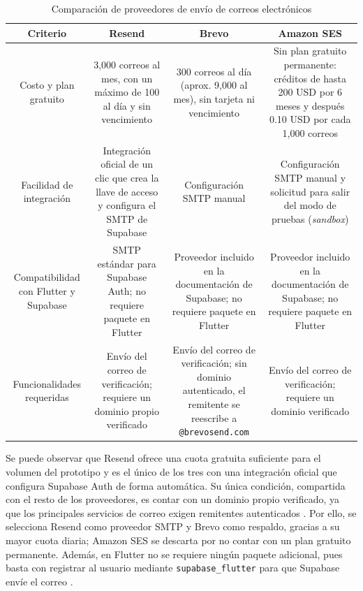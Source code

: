 \begin{table}[htbp]
\centering
\footnotesize
\caption{Comparación de proveedores de envío de correos electrónicos}
\label{tab:comparativa-correo}
\begin{tabularx}{\textwidth}{ |C|C|C|C| }
\hline
\textbf{Criterio} & \textbf{Resend} & \textbf{Brevo} & \textbf{Amazon SES} \\ \hline

Costo y plan gratuito &
3,000 correos al mes, con un máximo de 100 al día y sin vencimiento \cite{resend_pricing} &
300 correos al día (aprox. 9,000 al mes), sin tarjeta ni vencimiento \cite{brevo_api} &
Sin plan gratuito permanente: créditos de hasta 200 USD por 6 meses y después 0.10 USD por cada 1,000 correos \cite{amazon_ses_pricing} \\ \hline

Facilidad de integración &
Integración oficial de un clic que crea la llave de acceso y configura el SMTP de Supabase \cite{resend_supabase} &
Configuración SMTP manual \cite{supabase_smtp} &
Configuración SMTP manual y solicitud para salir del modo de pruebas (\textit{sandbox}) \cite{amazon_ses_pricing} \\ \hline

Compatibilidad con Flutter y Supabase &
SMTP estándar para Supabase Auth; no requiere paquete en Flutter \cite{resend_supabase} &
Proveedor incluido en la documentación de Supabase; no requiere paquete en Flutter \cite{supabase_smtp} &
Proveedor incluido en la documentación de Supabase; no requiere paquete en Flutter \cite{supabase_smtp} \\ \hline

Funcionalidades requeridas &
Envío del correo de verificación; requiere un dominio propio verificado \cite{resend_supabase} &
Envío del correo de verificación; sin dominio autenticado, el remitente se reescribe a \texttt{@brevosend.com} \cite{brevo_dominio} &
Envío del correo de verificación; requiere un dominio verificado \cite{amazon_ses_pricing} \\ \hline
\end{tabularx}
\end{table}

Se puede observar que Resend ofrece una cuota gratuita suficiente para el volumen del prototipo y es el único de los tres con una integración oficial que configura Supabase Auth de forma automática. Su única condición, compartida con el resto de los proveedores, es contar con un dominio propio verificado, ya que los principales servicios de correo exigen remitentes autenticados \cite{brevo_dominio}. Por ello, se selecciona Resend como proveedor SMTP y Brevo como respaldo, gracias a su mayor cuota diaria; Amazon SES se descarta por no contar con un plan gratuito permanente. Además, en Flutter no se requiere ningún paquete adicional, pues basta con registrar al usuario mediante \texttt{supabase\_flutter} para que Supabase envíe el correo \cite{supabase_flutter}.


